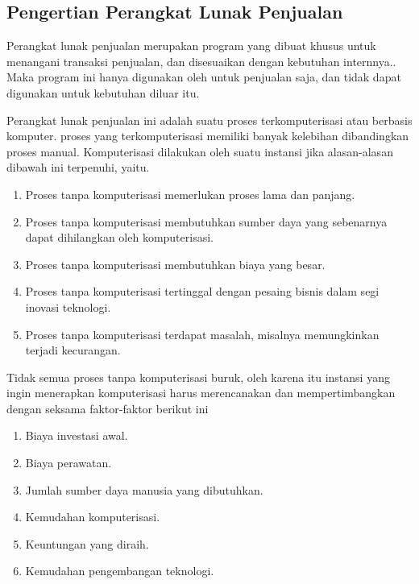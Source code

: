 \documentclass{article}
\begin{document}
\subsection{Pengertian Perangkat Lunak Penjualan}
Perangkat lunak penjualan merupakan program yang dibuat khusus untuk menangani transaksi penjualan, dan disesuaikan dengan kebutuhan internnya.. Maka program ini hanya digunakan oleh untuk penjualan saja, dan tidak dapat digunakan untuk kebutuhan diluar itu.

Perangkat lunak penjualan ini adalah suatu proses terkomputerisasi atau berbasis komputer. proses yang terkomputerisasi memiliki banyak kelebihan dibandingkan proses manual. Komputerisasi dilakukan oleh suatu instansi jika alasan-alasan dibawah ini terpenuhi, yaitu.
\begin{enumerate}
    \item Proses tanpa komputerisasi memerlukan proses lama dan panjang.
    \item Proses tanpa komputerisasi membutuhkan sumber daya yang sebenarnya dapat dihilangkan oleh komputerisasi.
    \item Proses tanpa komputerisasi membutuhkan biaya yang besar.
    \item Proses tanpa komputerisasi tertinggal dengan pesaing bisnis dalam segi inovasi teknologi.
    \item Proses tanpa komputerisasi terdapat masalah, misalnya memungkinkan terjadi kecurangan.
\end{enumerate}

Tidak semua proses tanpa komputerisasi buruk, oleh karena itu instansi yang ingin menerapkan komputerisasi harus merencanakan dan mempertimbangkan dengan seksama faktor-faktor berikut ini
\begin{enumerate}
    \item Biaya investasi awal.
    \item Biaya perawatan.
    \item Jumlah sumber daya manusia yang dibutuhkan.
    \item Kemudahan komputerisasi.
    \item Keuntungan yang diraih.
    \item Kemudahan pengembangan teknologi.
\end{enumerate}
\end{document}
